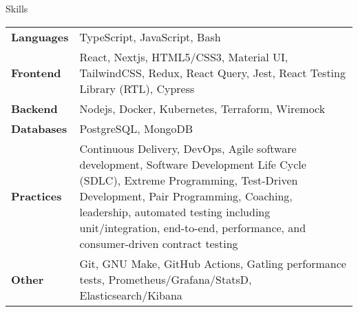 \begin{section}{Skills}
  \begin{tabularx}{\linewidth}{@{}l X@{}}
    \textbf{Languages} &\small{TypeScript, JavaScript, Bash} \\
    \textbf{Frontend} &\small{React, Nextjs, HTML5/CSS3, Material UI, TailwindCSS, Redux, React Query, Jest, React Testing Library (RTL), Cypress} \\
    \textbf{Backend} &\small{Nodejs, Docker, Kubernetes, Terraform, Wiremock} \\
    \textbf{Databases} &\small{PostgreSQL, MongoDB} \\
    \textbf{Practices} &\small{Continuous Delivery, DevOps, Agile software development, Software Development Life Cycle (SDLC), Extreme Programming, Test-Driven Development, Pair Programming, Coaching, leadership, automated testing including unit/integration, end-to-end, performance, and consumer-driven contract testing} \\
    \textbf{Other} &\small{Git, GNU Make, GitHub Actions, Gatling performance tests, Prometheus/Grafana/StatsD, Elasticsearch/Kibana} \\
  \end{tabularx}
\end{section}
